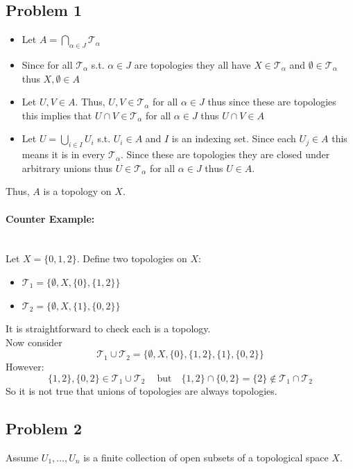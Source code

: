 \documentclass[12pt, letterpaper]{article}
\theoremstyle{definition}
\newcommand{\T}{\mathcal{T}}
\renewcommand{\t}[1]{\text{#1}}
\begin{document}
\pagestyle{fancy}
\fancyhf{}
\fancyhead[ROE]{\thepage}

\subsection*{Problem 1}
\begin{itemize}
    \item Let $A=\displaystyle{\bigcap_{\alpha \in J}}\T_\alpha$
    \item Since for all $\mathcal{T}_{\alpha}$ s.t. $\alpha \in J$ are topologies they all have $X \in \mathcal{T}_\alpha$ and $\emptyset \in \mathcal{T}_\alpha$ thus $X, \emptyset \in A$
    \item Let $U,V \in A$. Thus, $U,V \in \T_\alpha$ for all $\alpha \in J$ thus since these are topologies this implies that $U\cap V \in \T_\alpha$ for all $\alpha \in J$ thus $U \cap V \in A$
    \item Let $U=\displaystyle{\bigcup_{i \in I}} U_i$ s.t. $U_i \in A$ and $I$ is an indexing set. Since each $U_j \in A$ this means it is in every $\T_\alpha$. Since these are topologies they are closed under arbitrary unions thus $U \in \T_\alpha$ for all $\alpha \in J$ thus $U \in A$.
\end{itemize}
Thus, $A$ is a topology on $X$.
\paragraph*{Counter Example:}
\phantom{text}\\
Let $X=\{0,1,2\}$. Define two topologies on $X$:
\begin{itemize}
    \item $\T_1 = \{\emptyset, X, \{0\}, \{1,2\}\}$
    \item $\T_2 = \{\emptyset, X, \{1\}, \{0,2\}\}$
\end{itemize}
It is straightforward to check each is a topology.\\
Now consider
\[\T_1 \cup \T_2 = \{\emptyset, X, \{0\}, \{1,2\}, \{1\}, \{0,2\}\}\]
However:
\[\{1,2\},\{0,2\} \in \T_1 \cup \T_2\ \quad \t{but} \quad \{1,2\} \cap \{0,2\} = \{2\} \notin \T_1 \cap \T_2\]
So it is not true that unions of topologies are always topologies.

\newpage
\subsection*{Problem 2}
Assume $U_1,\dots,U_n$ is a finite collection of open subsets of a topological space $X$.
\end{document}
